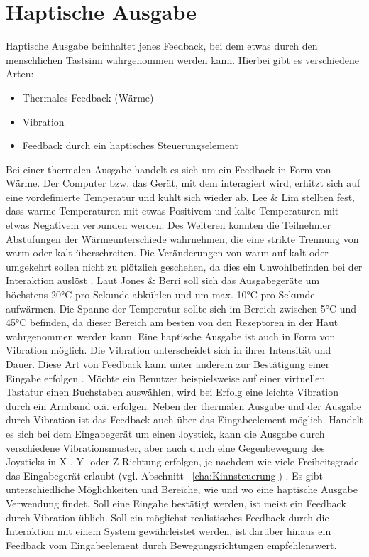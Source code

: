 \section{Haptische Ausgabe}
Haptische Ausgabe beinhaltet jenes Feedback, bei dem etwas durch den menschlichen Tastsinn wahrgenommen werden kann. Hierbei gibt es verschiedene Arten:
%
%
\begin{itemize}
      \item Thermales Feedback (\zB Wärme)
      \item Vibration
			\item Feedback durch ein haptisches Steuerungselement
\end{itemize}
\vspace{\baselineskip}
%
%
Bei einer thermalen Ausgabe handelt es sich um ein Feedback in Form von Wärme. Der Computer bzw. das Gerät, mit dem interagiert wird, erhitzt sich auf eine vordefinierte Temperatur und kühlt sich wieder ab. Lee \& Lim \cite{LeeLim} stellten fest, dass warme Temperaturen mit etwas Positivem und kalte Temperaturen mit etwas Negativem verbunden werden. Des Weiteren konnten die Teilnehmer Abstufungen der Wärmeunterschiede wahrnehmen, die eine strikte Trennung von warm oder kalt überschreiten. Die Veränderungen von warm auf kalt oder umgekehrt sollen nicht zu plötzlich geschehen, da dies ein Unwohlbefinden bei der Interaktion auslöst \cite{LeeLim}. \newline
Laut Jones \& Berri \cite{JonesBerris} soll sich das Ausgabegeräte um höchstens 20°C pro Sekunde abkühlen und um max. 10°C pro Sekunde aufwärmen. Die Spanne der Temperatur sollte sich im Bereich zwischen 5°C und 45°C befinden, da dieser Bereich am besten von den Rezeptoren in der Haut wahrgenommen werden kann.
\newline \newline
Eine haptische Ausgabe ist auch in Form von Vibration möglich. Die Vibration unterscheidet sich in ihrer Intensität und Dauer. Diese Art von Feedback kann unter anderem zur Bestätigung einer Eingabe erfolgen \cite{Vibration}. Möchte ein Benutzer beispielsweise auf einer virtuellen Tastatur einen Buchstaben auswählen, wird bei Erfolg eine leichte Vibration durch ein Armband o.ä. erfolgen.
\newline \newline
Neben der thermalen Ausgabe und der Ausgabe durch Vibration ist das Feedback auch über das Eingabeelement möglich. Handelt es sich bei dem Eingabegerät um einen Joystick, kann die Ausgabe durch verschiedene Vibrationsmuster, aber auch durch eine Gegenbewegung des Joysticks in X-, Y- oder Z-Richtung erfolgen, je nachdem wie viele Freiheitsgrade das Eingabegerät erlaubt (vgl. Abschnitt ~\ref{cha:Kinnsteuerung}) \cite{an2002haptic}. 
\newline \newline
Es gibt unterschiedliche Möglichkeiten und Bereiche, wie und wo eine haptische Ausgabe Verwendung findet. Soll eine Eingabe bestätigt werden, ist meist ein Feedback durch Vibration üblich. Soll ein möglichst realistisches Feedback durch die Interaktion mit einem System gewährleistet werden, ist darüber hinaus ein Feedback vom Eingabeelement durch Bewegungsrichtungen empfehlenswert.  
\newpage
